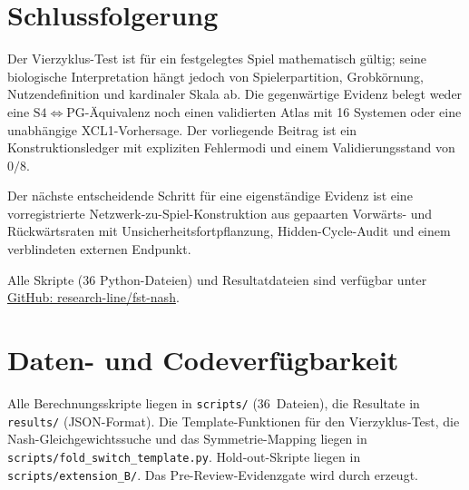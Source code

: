 \documentclass[12pt,a4paper]{article}
\begin{document}
\section{Schlussfolgerung}
\label{sec:conclusion}

Der Vierzyklus-Test ist für ein festgelegtes Spiel mathematisch gültig;
seine biologische Interpretation hängt jedoch von Spielerpartition,
Grobkörnung, Nutzendefinition und kardinaler Skala ab. Die
gegenwärtige Evidenz belegt weder eine $\mathrm{S4}\iff\mathrm{PG}$-Äquivalenz
noch einen validierten Atlas mit 16 Systemen oder eine unabhängige
XCL1-Vorhersage. Der vorliegende Beitrag ist ein Konstruktionsledger mit
expliziten Fehlermodi und einem Validierungsstand von $0/8$.

Der nächste entscheidende Schritt für eine eigenständige Evidenz ist eine vorregistrierte
Netzwerk-zu-Spiel-Konstruktion aus gepaarten Vorwärts- und Rückwärtsraten
mit Unsicherheitsfortpflanzung, Hidden-Cycle-Audit und einem verblindeten
externen Endpunkt.

Alle Skripte (36 Python-Dateien) und Resultatdateien sind verfügbar
unter \href{https://github.com/research-line/fst-nash}{GitHub: research-line/fst-nash}.


\section*{Daten- und Codeverfügbarkeit}

Alle Berechnungsskripte liegen in \texttt{scripts/} (36~Dateien), die
Resultate in \texttt{results/} (JSON-Format). Die Template-Funktionen für
den Vierzyklus-Test, die Nash-Gleichgewichtssuche und das
Symmetrie-Mapping liegen in \texttt{scripts/fold\_switch\_template.py}.
Hold-out-Skripte liegen in \texttt{scripts/extension\_B/}. Das
Pre-Review-Evidenzgate wird durch
 erzeugt.


\begin{sloppypar}

\end{sloppypar}
\end{document}
